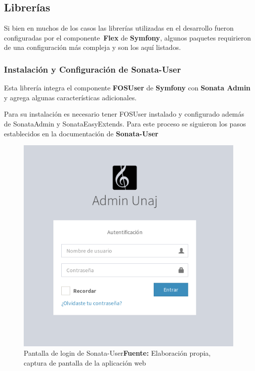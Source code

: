
\subsection{Librerías}%
\label{sub:librerias}

Si bien en muchos de los casos las librerías utilizadas en el desarrollo fueron configuradas por el componente~\textbf{Flex}  de \textbf{Symfony}, algunos paquetes
requirieron de una configuración más compleja y son los aquí listados.

\subsubsection{Instalación y Configuración de Sonata-User}%
\label{ssub:instalacion_y_configuración_de_sonata-user}

Esta librería integra el componente \textbf{FOSUser} de \textbf{Symfony} con \textbf{Sonata Admin} y agrega algunas características adicionales.




Para su instalación es necesario tener FOSUser instalado y configurado además de SonataAdmin y SonataEasyExtends\@.
Para este proceso se siguieron los pasos establecidos en la documentación de \textbf{Sonata-User}~\parencite{sonata-user}

\begin{figure}[H]
    \includegraphics[width=1\linewidth]{image/adminLogin.png}
    \caption{Pantalla de login de Sonata-User\newline \textbf{Fuente:} Elaboración propia, captura de pantalla de la aplicación web}
    \label{fig:image/adminLogin}
\end{figure}

